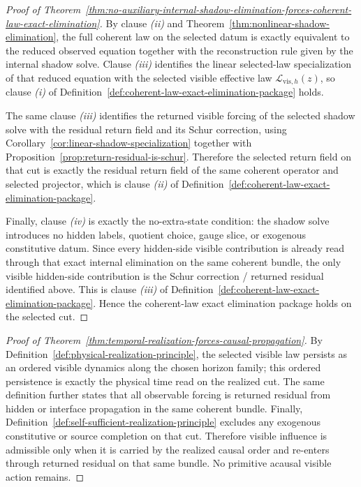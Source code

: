 \begin{proof}[Proof of Theorem~\ref{thm:no-auxiliary-internal-shadow-elimination-forces-coherent-law-exact-elimination}]
\label{proof:thm:no-auxiliary-internal-shadow-elimination-forces-coherent-law-exact-elimination}
By clause \emph{(ii)} and
Theorem~\ref{thm:nonlinear-shadow-elimination}, the full coherent law on the
selected datum is exactly equivalent to the reduced observed equation together
with the reconstruction rule given by the internal shadow solve. Clause
\emph{(iii)} identifies the linear selected-law specialization of that reduced
equation with the selected visible effective law
\(\mathcal L_{\mathrm{vis},h}(z)\), so clause \emph{(i)} of
Definition~\ref{def:coherent-law-exact-elimination-package} holds.

The same clause \emph{(iii)} identifies the returned visible forcing of the
selected shadow solve with the residual return field and its Schur correction,
using Corollary~\ref{cor:linear-shadow-specialization} together with
Proposition~\ref{prop:return-residual-is-schur}. Therefore the selected return
field on that cut is exactly the residual return field of the same coherent
operator and selected projector, which is clause \emph{(ii)} of
Definition~\ref{def:coherent-law-exact-elimination-package}.

Finally, clause \emph{(iv)} is exactly the no-extra-state condition: the shadow
solve introduces no hidden labels, quotient choice, gauge slice, or exogenous
constitutive datum. Since every hidden-side visible contribution is already
read through that exact internal elimination on the same coherent bundle, the
only visible hidden-side contribution is the Schur correction / returned
residual identified above. This is clause \emph{(iii)} of
Definition~\ref{def:coherent-law-exact-elimination-package}. Hence the
coherent-law exact elimination package holds on the selected cut.
\end{proof}

\begin{proof}[Proof of Theorem~\ref{thm:temporal-realization-forces-causal-propagation}]
\label{proof:thm:temporal-realization-forces-causal-propagation}
By Definition~\ref{def:physical-realization-principle}, the selected visible
law persists as an ordered visible dynamics along the chosen horizon family;
this ordered persistence is exactly the physical time read on the realized cut.
The same definition further states that all observable forcing is returned
residual from hidden or interface propagation in the same coherent bundle.
Finally, Definition~\ref{def:self-sufficient-realization-principle} excludes
any exogenous constitutive or source completion on that cut. Therefore visible
influence is admissible only when it is carried by the realized causal order
and re-enters through returned residual on that same bundle. No primitive
acausal visible action remains.
\end{proof}

